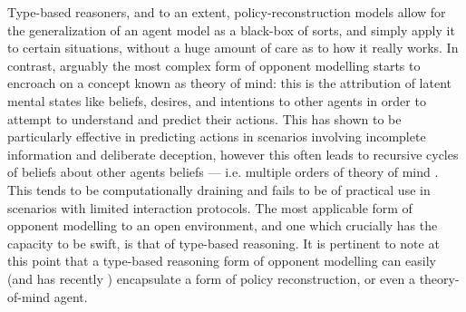 \newline \newline
Type-based reasoners, and to an extent, policy-reconstruction models allow for the generalization of an agent model as a black-box of sorts, and simply apply it to certain situations, without a huge amount of care as to how it really works. In contrast, arguably the most complex form of opponent modelling starts to encroach on a concept known as theory of mind: this is the attribution of latent mental states like beliefs, desires, and intentions to other agents in order to attempt to understand and predict their actions. This has shown to be particularly effective in predicting actions in scenarios involving incomplete information and deliberate deception, however this often leads to recursive cycles of beliefs about other agents beliefs --- i.e. multiple orders of theory of mind \cite{InteractivePOMDPs_panella_gmytrasiewicz}.  This tends to be computationally draining and fails to be of practical use in scenarios with limited interaction protocols. 
\newline \newline
The most applicable form of opponent modelling to an open environment, and one which crucially has the capacity to be swift, is that of type-based reasoning. It is pertinent to note at this point that a type-based reasoning form of opponent modelling can easily (and has recently \cite{Albrecht__explioting_causality}) encapsulate a form of policy reconstruction, or even a theory-of-mind agent.
